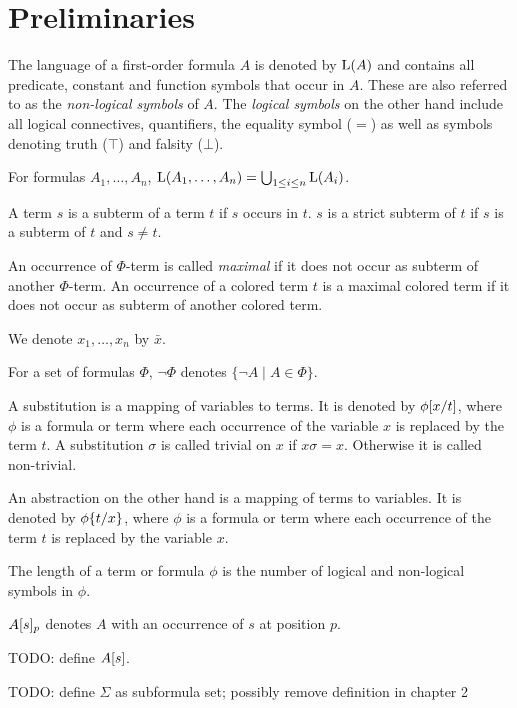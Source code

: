 \section{Preliminaries}

The language of a first-order formula $A$ is denoted by $\operatorname{L}(A)$ and contains all predicate, constant and function symbols that occur in $A$.
These are also referred to as the \emph{\mbox{non-logical} symbols} of $A$.
The \emph{logical symbols} on the other hand include all logical connectives, quantifiers, the equality symbol ($=$) as well as symbols denoting truth ($\top$) and falsity ($\bot$).

For formulas $A_1, \ldots, A_n$, $\operatorname{L}(A_1, \ldots, A_n) = \bigcup_{1\leq i \leq n} \operatorname{L}(A_i)$.

A term $s$ is a subterm of a term $t$ if $s$ occurs in $t$. $s$ is a strict subterm of $t$ if $s$ is a subterm of $t$ and $s \neq t$.

An occurrence of $\Phi$-term is called \emph{maximal} if it does not occur as subterm of another $\Phi$-term.
An occurrence of a colored term $t$ is a maximal colored term if it does not occur as subterm of another colored term.

We denote $x_1, \ldots, x_n$ by $\bar x$.

For a set of formulas $\Phi$, $\lnot \Phi$ denotes $\{\lnot A \mid A \in \Phi\}$.

A substitution is a mapping of variables to terms. It is denoted by $\phi[x/t]$, where $\phi$ is a formula or term where each occurrence of the variable $x$ is replaced by the term $t$.
A substitution $\sigma$ is called trivial on $x$ if $x\sigma = x$. Otherwise it is called non-trivial.

An abstraction on the other hand is a mapping of terms to variables. It is denoted by $\phi\{t/x\}$, where $\phi$ is a formula or term where each occurrence of the term $t$ is replaced by the variable $x$.

The length of a term or formula $\phi$ is the number of logical and non-logical symbols in $\phi$.

$A{[s]_{p}}$ denotes $A$ with an occurrence of $s$ at position $p$.

TODO: define $A[s]$.

TODO: define $\Sigma$ as subformula set; possibly remove definition in chapter 2

